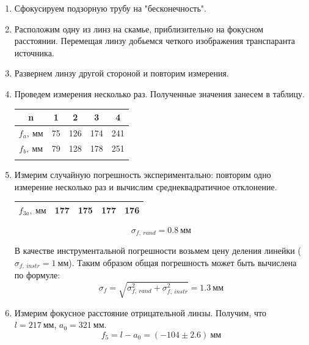 \documentclass[14pt, a4paper]{report}
\begin{document}
\begin{enumerate}

\item Сфокусируем подзорную трубу на "бесконечность".

\item Расположим одну из линз на скамье, приблизительно на фокусном расстоянии. Перемещая линзу добьемся четкого изображения транспаранта источника.

\item Развернем линзу другой стороной и повторим измерения.

\item Проведем измерения несколько раз. Полученные значения занесем в таблицу.

\begin{table}[H]
\centering
\begin{tabular}{ccccc}
\hline
\multicolumn{1}{|c|}{n}          & \multicolumn{1}{c|}{1}  & \multicolumn{1}{c|}{2}   & \multicolumn{1}{c|}{3}   & \multicolumn{1}{c|}{4}   \\ \hline
\multicolumn{1}{|c|}{$f_a,\ мм$} & \multicolumn{1}{c|}{75} & \multicolumn{1}{c|}{126} & \multicolumn{1}{c|}{174} & \multicolumn{1}{c|}{241} \\ \hline
\multicolumn{1}{|c|}{$f_b,\ мм$} & \multicolumn{1}{c|}{79} & \multicolumn{1}{c|}{128} & \multicolumn{1}{c|}{178} & \multicolumn{1}{c|}{251} \\ \hline
\multicolumn{1}{l}{}             & \multicolumn{1}{l}{}    & \multicolumn{1}{l}{}     & \multicolumn{1}{l}{}     & \multicolumn{1}{l}{}    
\end{tabular}
\end{table}

\item Измерим случайную погрешность экспериментально: повторим одно измерение несколько раз и вычислим среднеквадратичное отклонение.

\begin{table}[H]
\centering
\begin{tabular}{|c|c|c|c|c|}
\hline
$f_{3a},\ мм$ & 177 & 175 & 177 & 176 \\ \hline
\end{tabular}
\end{table}

\[\sigma_{f,\ rand}=0.8\ мм\]

В качестве инструментальной погрешности возьмем цену деления линейки ($\sigma_{f,\ instr}=1\ мм$). Таким образом общая погрешность может быть вычислена по формуле:
\[\sigma_f=\sqrt{\sigma_{f,\ rand}^2+\sigma_{f,\ instr}^2}=1.3\ мм\]

\item Измерим фокусное расстояние отрицательной линзы. Получим, что $l=217\ мм$, $a_0=321\ мм$.
\[f_5=l-a_0=(-104\pm2.6)\ мм\]

\end{enumerate}
\end{document}
